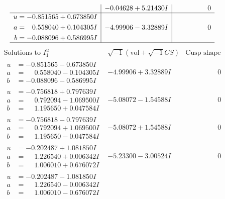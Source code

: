 \documentclass[1p]{elsarticle_modified}
\theoremstyle{definition}
\newcommand{\I}{\sqrt{-1}}
\begin{document}
$$\begin{array}{c|c|c}
 & -0.04628 + 5.21430 I & \phantom{-0.000000 } 0 \\ \hline\begin{aligned}
u &= -0.851565 + 0.673850 I \\
a &= \phantom{-}0.558040 + 0.104305 I \\
b &= -0.088096 + 0.586995 I\end{aligned}
 & -4.99906 - 3.32889 I & \phantom{-0.000000 } 0\\
 \hline 
 \end{array}$$\newpage$$\begin{array}{c|c|c}  
\text{Solutions to }I^u_{1}& \I (\text{vol} + \sqrt{-1}CS) & \text{Cusp shape}\\
 \hline 
\begin{aligned}
u &= -0.851565 - 0.673850 I \\
a &= \phantom{-}0.558040 - 0.104305 I \\
b &= -0.088096 - 0.586995 I\end{aligned}
 & -4.99906 + 3.32889 I & \phantom{-0.000000 } 0 \\ \hline\begin{aligned}
u &= -0.756818 + 0.797639 I \\
a &= \phantom{-}0.792094 - 1.069500 I \\
b &= \phantom{-}1.195650 + 0.047584 I\end{aligned}
 & -5.08072 - 1.54588 I & \phantom{-0.000000 } 0 \\ \hline\begin{aligned}
u &= -0.756818 - 0.797639 I \\
a &= \phantom{-}0.792094 + 1.069500 I \\
b &= \phantom{-}1.195650 - 0.047584 I\end{aligned}
 & -5.08072 + 1.54588 I & \phantom{-0.000000 } 0 \\ \hline\begin{aligned}
u &= -0.202487 + 1.081850 I \\
a &= \phantom{-}1.226540 + 0.006342 I \\
b &= \phantom{-}1.006010 + 0.676072 I\end{aligned}
 & -5.23300 - 3.00524 I & \phantom{-0.000000 } 0 \\ \hline\begin{aligned}
u &= -0.202487 - 1.081850 I \\
a &= \phantom{-}1.226540 - 0.006342 I \\
b &= \phantom{-}1.006010 - 0.676072 I\end{aligned}

\end{array}$$
\end{document}
